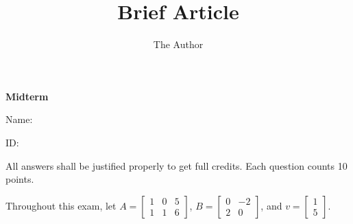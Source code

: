 \documentclass[11pt]{amsart}
\title{Brief Article}
\author{The Author}
\begin{document}

\begin{center}
{\bf Midterm}
\end{center}

Name: 

ID: 

All answers shall be justified properly to get full credits.
Each question counts 10 points.
\vspace{.2in}


Throughout this exam, let 
$A = 
\begin{bmatrix}
1 & 0 & 5\\
1 & 1 & 6
\end{bmatrix}
$, 
$B = \begin{bmatrix}
0 & -2 \\
2 & 0
\end{bmatrix}
$,
and 
$
v
 = 
\begin{bmatrix}
1\\
5
\end{bmatrix}
$.
\vspace{.2in}
\end{document}
